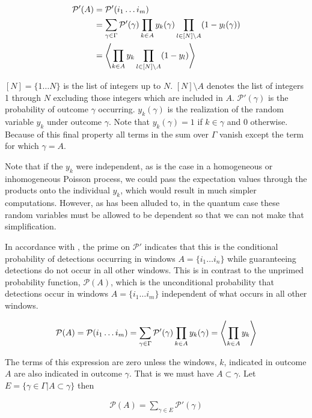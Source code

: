\documentclass[12pt]{article}
\begin{document}
\begin{align}
\mathcal{P}'(A) &= \mathcal{P}'(i_1 \ldots i_m)\\
&= \sum_{\gamma \in \Gamma} \mathcal{P}'(\gamma) \prod_{k \in A} y_k(\gamma) \prod_{l \in [N] \setminus A} (1-y_l(\gamma))\\
&=\Braket{\prod_{k \in A} y_k \prod_{l \in [N] \setminus A} (1-y_l)}
\end{align}

$[N] = \{1 \ldots N\}$ is the list of integers up to $N$. $[N]\setminus A$ denotes the list of integers 1 through $N$ excluding those integers which are included in $A$. $\mathcal{P}'(\gamma)$ is the probability of outcome $\gamma$ occurring. $y_k(\gamma)$ is the realization of the random variable $y_k$ under outcome $\gamma$. Note that $y_k(\gamma)=1$ if $k \in \gamma$ and 0 otherwise. Because of this final property all terms in the sum over $\Gamma$ vanish except the term for which $\gamma = A$.

Note that if the $y_k$ were independent, as is the case in a homogeneous or inhomogeneous Poisson process, we could pass the expectation values through the products onto the individual $y_k$, which would result in much simpler computations. However, as has been alluded to, in the quantum case these random variables must be allowed to be dependent so that we can not make that simplification.

In accordance with \cite{Kelley1964}, the prime on $\mathcal{P}'$ indicates that this is the conditional probability of detections occurring in windows $A=\{i_1 \ldots i_n\}$ while guaranteeing detections do not occur in all other windows. This is in contrast to the unprimed probability function, $\mathcal{P}(A)$, which is the unconditional probability that detections occur in windows $A=\{i_1 \ldots i_m\}$ independent of what occurs in all other windows.

\begin{align}
\mathcal{P}(A) = \mathcal{P}(i_1 \ldots i_m) = \sum_{\gamma \in \Gamma} \mathcal{P}'(\gamma) \prod_{k \in A}y_k(\gamma)  = \Braket{\prod_{k \in A} y_k}
\end{align}

The terms of this expression are zero unless the windows, $k$, indicated in outcome $A$ are also indicated in outcome $\gamma$. That is we must have $A \subset \gamma$. Let $E = \{\gamma \in \Gamma| A \subset \gamma\}$ then

\begin{align}
\mathcal{P}(A) = \sum_{\gamma \in E} \mathcal{P}'(\gamma)
\end{align}
\end{document}
